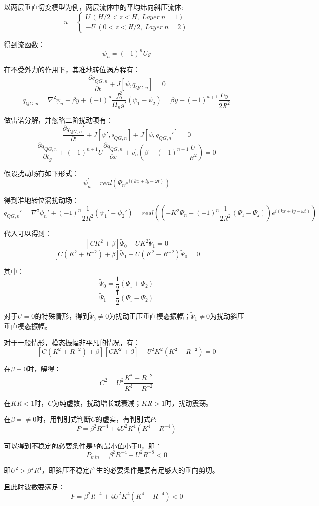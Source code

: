 \documentclass{article}
\begin{document}
以两层垂直切变模型为例，两层流体中的平均纬向斜压流体:
$$u=\begin{cases}
    U \ (H/2<z<H,\ Layer \ n=1) \\
    -U \ (0 < z < H/2, \ Layer \ n=2)
\end{cases}$$

得到流函数：
$$\psi_n = (-1)^{n}Uy$$

在不受外力的作用下，其准地转位涡方程有：
$$\frac{\partial q_{QG,n}}{\partial t} + J[\psi, q_{QG,n}] = 0$$
$$q_{QG,n} 
=\nabla^2\psi_n + \beta y + (-1)^{n}\frac{f_0^2}{H_ng'}(\psi_1 - \psi_2)
=\beta y + (-1)^{n+1}\frac{Uy}{2R^2}$$

做雷诺分解，并忽略二阶扰动项有：
$$\frac{\partial q_{QG,n}'}{\partial t} 
+ J[\psi', \overline{q}_{QG,n}]
+ J[\overline{\psi}, q_{QG,n}'] = 0$$
$$$$
$$\frac{\partial q^{\prime}_{QG,n}}{\partial t_g} 
+ (-1)^{n+1}U\frac{\partial q^{\prime}_{QG,n}}{\partial x} 
+ v^{\prime}_n\left(\beta + (-1)^{n+1}\frac{U}{R^2}\right)= 0$$

假设扰动场有如下形式：
$$\psi^{\prime}_n = real(\Psi_ne^{i(kx+ly-\omega t)})$$

得到准地转位涡扰动场：
$$q_{QG,n}' = \nabla^2\psi_n' + (-1)^{n}\frac{1}{2R^2}(\psi_1' - \psi_2') 
= real((-K^2\Psi_n + (-1)^{n}\frac{1}{2R^2}(\Psi_1 - \Psi_2))e^{i(kx+ly-\omega t)})  $$

代入可以得到：
$$[CK^2 +\beta]\tilde{\Psi}_0-UK^2\tilde{\Psi}_1 = 0$$
$$[C(K^2+R^{-2}) +\beta]\tilde{\Psi}_1-U(K^2-R^{-2})\tilde{\Psi}_0 = 0$$

其中：
$$\tilde{\Psi}_0 = \frac{1}{2}(\Psi_1 +\Psi_2)$$
$$\tilde{\Psi}_1 = \frac{1}{2}(\Psi_1 -\Psi_2)$$

对于$U=0$的特殊情形，得到$\tilde{\Psi}_0\ne0$为扰动正压垂直模态振幅；$\tilde{\Psi}_1\ne0$为扰动斜压垂直模态振幅。

对于一般情形，模态振幅非平凡的情况，有：
$$[C(K^2+R^{-2}) +\beta][CK^2 +\beta]-U^2K^2(K^2-R^{-2}) = 0$$

在$\beta=0$时，解得：
$$C^2 = U^2\frac{K^2-R^{-2}}{K^2+R^{-2}}$$

在$KR<1$时，$C$为纯虚数，扰动增长或衰减；$KR>1$时，扰动震荡。

在$\beta=\ne0$时，用判别式判断$C$的虚实，有判别式$P$:
$$P=\beta^2R^{-4}+4U^2K^4(K^4-R^{-4})$$

可以得到不稳定的必要条件是$P$的最小值小于$0$，即：
$$P_{min}=\beta^2R^{-4}-U^2R^{-8}<0$$

即$U^2 > \beta^2R^4$，即斜压不稳定产生的必要条件是要有足够大的垂向剪切。

且此时波数要满足：
$$P=\beta^2R^{-4}+4U^2K^4(K^4-R^{-4})<0$$
\end{document}
